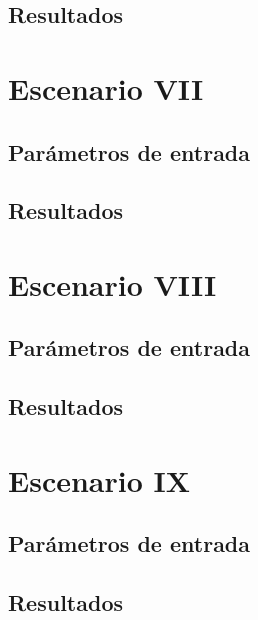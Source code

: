 \subsection{Resultados}


\section{Escenario VII}
\subsection{Parámetros de entrada}
\subsection{Resultados}


\section{Escenario VIII}
\subsection{Parámetros de entrada}
\subsection{Resultados}


\section{Escenario IX}
\subsection{Parámetros de entrada}
\subsection{Resultados}
